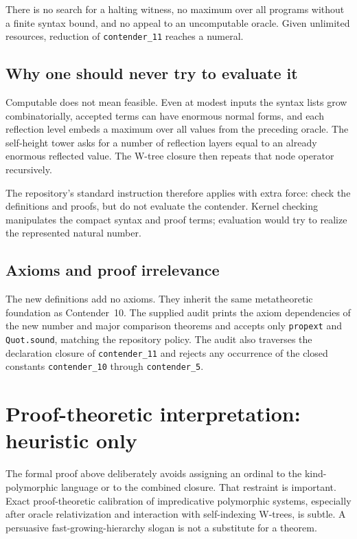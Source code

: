 \documentclass[11pt]{article}
\theoremstyle{definition}
\theoremstyle{remark}
\newcommand{\code}[1]{\texttt{#1}}
\begin{document}
There is no search for a halting witness, no maximum over all programs without
a finite syntax bound, and no appeal to an uncomputable oracle. Given unlimited
resources, reduction of \code{contender\_11} reaches a numeral.

\subsection{Why one should never try to evaluate it}

Computable does not mean feasible. Even at modest inputs the syntax lists grow
combinatorially, accepted terms can have enormous normal forms, and each
reflection level embeds a maximum over all values from the preceding oracle.
The self-height tower asks for a number of reflection layers equal to an
already enormous reflected value. The W-tree closure then repeats that node
operator recursively.

The repository's standard instruction therefore applies with extra force:
check the definitions and proofs, but do not evaluate the contender. Kernel
checking manipulates the compact syntax and proof terms; evaluation would try
to realize the represented natural number.

\subsection{Axioms and proof irrelevance}

The new definitions add no axioms. They inherit the same metatheoretic
foundation as Contender~10. The supplied audit prints the axiom dependencies of
the new number and major comparison theorems and accepts only
\code{propext} and \code{Quot.sound}, matching the repository policy. The audit
also traverses the declaration closure of \code{contender\_11} and rejects any
occurrence of the closed constants \code{contender\_10} through
\code{contender\_5}.

\section{Proof-theoretic interpretation: heuristic only}

The formal proof above deliberately avoids assigning an ordinal to the
kind-polymorphic language or to the combined closure. That restraint is
important. Exact proof-theoretic calibration of impredicative polymorphic
systems, especially after oracle relativization and interaction with
self-indexing W-trees, is subtle. A persuasive fast-growing-hierarchy slogan is
not a substitute for a theorem.
\end{document}
